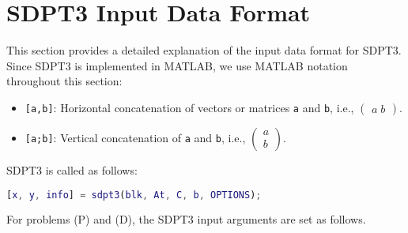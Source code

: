 \section{SDPT3 Input Data Format}
This section provides a detailed explanation of the input data format for SDPT3.
Since SDPT3 is implemented in MATLAB, we use MATLAB notation throughout this section:
\begin{itemize}
\item \texttt{[a,b]}: Horizontal concatenation of vectors or matrices \texttt{a} and \texttt{b}, i.e., $\begin{pmatrix} a \; b \end{pmatrix}$.
\item \texttt{[a;b]}: Vertical concatenation of \texttt{a} and \texttt{b}, i.e., $\begin{pmatrix} a \\ b \end{pmatrix}$.
\end{itemize}

SDPT3 is called as follows:
\begin{lstlisting}[language=Matlab]
[x, y, info] = sdpt3(blk, At, C, b, OPTIONS);
\end{lstlisting}

For problems (P) and (D), the SDPT3 input arguments are set as follows.

